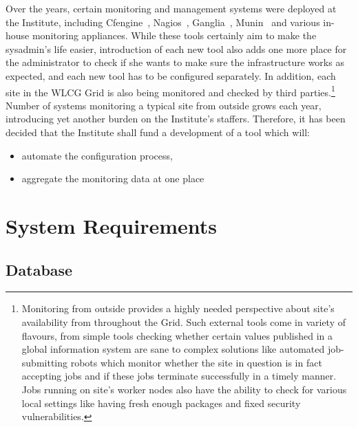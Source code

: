 \documentclass[12pt]{article}
\begin{document}
Over the years, certain monitoring and management systems were deployed at the Institute, including Cfengine~\cite{cfengine},
Nagios~\cite{nagios}, Ganglia~\cite{ganglia}, Munin~\cite{munin} and various in-house monitoring appliances.  While these tools
certainly aim to make the sysadmin's life easier, introduction of each new tool also adds one more place for the administrator to
check if she wants to make sure the infrastructure works as expected, and each new tool has to be configured separately.  In
addition, each site in the WLCG Grid is also being monitored and checked by third parties.\footnote{Monitoring from outside
provides a highly needed perspective about site's availability from throughout the Grid.  Such external tools come in variety of
flavours, from simple tools checking whether certain values published in a global information system are sane to complex solutions
like automated job-submitting robots which monitor whether the site in question is in fact accepting jobs and if these jobs
terminate successfully in a timely manner.  Jobs running on site's worker nodes also have the ability to check for various local
settings like having fresh enough packages and fixed security vulnerabilities.}  Number of systems monitoring a typical site from
outside grows each year, introducing yet another burden on the Institute's staffers.  Therefore, it has been decided that the
Institute shall fund a development of a tool which will:

\begin{itemize}
    \item{automate the configuration process,}
    \item{aggregate the monitoring data at one place}
\end{itemize}

\section{System Requirements}

\subsection{Database}
\end{document}
